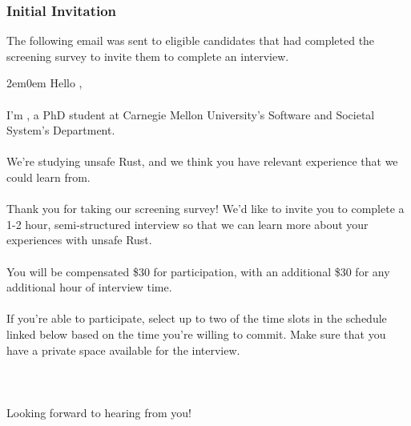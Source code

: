 \subsubsection{Initial Invitation}
The following email was sent to eligible candidates that had completed the screening survey to invite them to complete an interview.
\\
\begin{adjustwidth}{2em}{0em}
\noindent Hello ,
\\\\
\noindent I’m , a PhD student at Carnegie Mellon University’s Software and Societal
System’s Department.
\\\\
\noindent We’re studying unsafe Rust, and we think you have relevant experience that we could learn
from.
\\\\
\noindent Thank you for taking our screening survey! We’d like to invite you to complete a 1-2 hour,
semi-structured interview so that we can learn more about your experiences with unsafe Rust.
\\\\
\noindent You will be compensated \$30 for participation, with an additional \$30 for any additional hour of
interview time.
\\\\
\noindent If you’re able to participate, select up to two of the time slots in the schedule linked below based
on the time you’re willing to commit. Make sure that you have a private space available for the
interview.
\\\\
\\\\
\noindent Looking forward to hearing from you!
\\\\
\end{adjustwidth}


